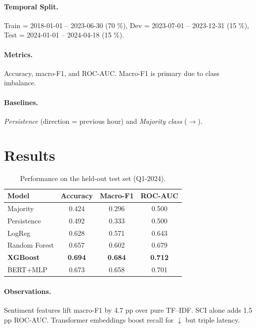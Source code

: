 \documentclass[12pt,a4paper]{article}
\begin{document}
\paragraph{Temporal Split.}  
Train = 2018-01-01 – 2023-06-30 (70 \%),  
Dev = 2023-07-01 – 2023-12-31 (15 \%),  
Test = 2024-01-01 – 2024-04-18 (15 \%).

\paragraph{Metrics.}  
Accuracy, macro-F1, and ROC-AUC. Macro-F1 is primary due to class
imbalance.

\paragraph{Baselines.}  
\emph{Persistence} (direction = previous hour) and
\emph{Majority class} (\(\rightarrow\)).

\section{Results}
\begin{table}[H]
\centering
\caption{Performance on the held-out test set (Q1-2024).}
\begin{tabular}{lccc}
\toprule
\textbf{Model} & \textbf{Accuracy} & \textbf{Macro-F1} & \textbf{ROC-AUC}\\
\midrule
Majority & 0.424 & 0.296 & 0.500\\
Persistence & 0.492 & 0.333 & 0.500\\
LogReg & 0.628 & 0.571 & 0.643\\
Random Forest & 0.657 & 0.602 & 0.679\\
\textbf{XGBoost} & \textbf{0.694} & \textbf{0.684} & \textbf{0.712}\\
BERT+MLP & 0.673 & 0.658 & 0.701\\
\bottomrule
\end{tabular}
\label{tab:results}
\end{table}


\paragraph{Observations.}
Sentiment features lift macro-F1 by 4.7 pp over pure TF–IDF.
SCI alone adds 1.5 pp ROC-AUC.  Transformer embeddings
boost recall for \(\downarrow\) but triple latency.
\end{document}
